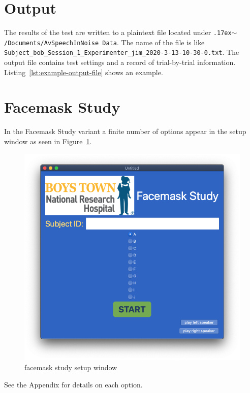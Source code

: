 \documentclass[11pt,pdftex,letterpaper]{article}
\newcommand{\mytilde}{\raise.17ex\hbox{$\scriptstyle\mathtt{\sim}$}}
\begin{document}
\section{Output}
The results of the test are written to a plaintext file located under \texttt{\mytilde/Documents/AvSpeechInNoise Data}. The name of the file is like \texttt{Subject\_bob\_Session\_1\_Experimenter\_jim\_2020-3-13-10-30-0.txt}. The output file contains test settings and a record of trial-by-trial information. Listing~\ref{lst:example-output-file} shows an example.

\noindent\begin{minipage}{\textwidth}

\end{minipage}

\section{Facemask Study}
In the Facemask Study variant a finite number of options appear in the setup window as seen in Figure~\ref{fig:facemask-study}.
\begin{figure}
	\centering
	\includegraphics[width = 0.9\linewidth]{facemask-study.png}
	\caption{facemask study setup window}
	\label{fig:facemask-study}
\end{figure}
See the Appendix for details on each option.
\end{document}
